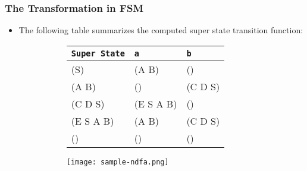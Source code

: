 \documentclass{beamer}
\begin{document}
\begin{frame}[fragile]
\frametitle{The Transformation in FSM}
\begin{scriptsize}
\begin{itemize}
\normalsize
\item<1->
The following table summarizes the computed super state transition function: \newline
\begin{figure}[t!]
\centering
\begin{subfigure}{0.7\textwidth}
\begin{center}
\begin{tabular}{|l|l|l|}
  \hline
  \texttt{Super State} & \texttt{a}         & \texttt{b} \\ \hline
  (S)         & (A B)     & () \\ \hline
  (A B)       & ()        & (C D S) \\ \hline
  (C D S)     & (E S A B) & () \\ \hline
  (E S A B)   & (A B)     & (C D S) \\ \hline
  ()          & ()        & () \\ \hline
\end{tabular}
\end{center}
\end{subfigure}
\hfill
\begin{subfigure}{0.4\textwidth}
\centering
\texttt{[image: sample-ndfa.png]}
\label{aa-ab}
\end{subfigure}
\end{figure}
\end{itemize}
\end{scriptsize}
\end{frame}
\end{document}
